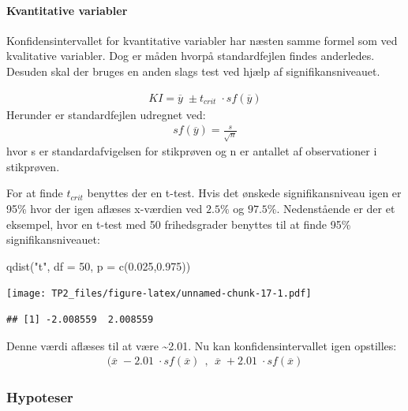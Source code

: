 \documentclass[
]{article}
\newenvironment{Shaded}{\begin{snugshade}}{\end{snugshade}}
\newcommand{\AttributeTok}[1]{\textcolor[rgb]{0.77,0.63,0.00}{#1}}
\newcommand{\DecValTok}[1]{\textcolor[rgb]{0.00,0.00,0.81}{#1}}
\newcommand{\FloatTok}[1]{\textcolor[rgb]{0.00,0.00,0.81}{#1}}
\newcommand{\FunctionTok}[1]{\textcolor[rgb]{0.00,0.00,0.00}{#1}}
\newcommand{\NormalTok}[1]{#1}
\newcommand{\StringTok}[1]{\textcolor[rgb]{0.31,0.60,0.02}{#1}}
\begin{document}
\hypertarget{kvantitative-variabler}{%
\paragraph{Kvantitative variabler}\label{kvantitative-variabler}}

Konfidensintervallet for kvantitative variabler har næsten samme formel
som ved kvalitative variabler. Dog er måden hvorpå standardfejlen findes
anderledes. Desuden skal der bruges en anden slags test ved hjælp af
signifikansniveauet.

\[
\begin{aligned}
KI = \overline{y}\;\pm t_{crit} \;\cdot sf(\overline{y})
\end{aligned}
\] Herunder er standardfejlen udregnet ved: \[
\begin{aligned}
sf(\overline{y}) = \frac{s}{\sqrt{n}}
\end{aligned}
\] hvor s er standardafvigelsen for stikprøven og n er antallet af
observationer i stikprøven.

For at finde \(t_{crit}\) benyttes der en t-test. Hvis det ønskede
signifikansniveau igen er 95\% hvor der igen aflæses x-værdien ved
\(2.5\%\) og \(97.5\%\). Nedenstående er der et eksempel, hvor en t-test
med 50 frihedsgrader benyttes til at finde 95\% signifikansniveauet:

\begin{Shaded}
\begin{Highlighting}[]
\FunctionTok{qdist}\NormalTok{(}\StringTok{"t"}\NormalTok{, }\AttributeTok{df =} \DecValTok{50}\NormalTok{, }\AttributeTok{p =} \FunctionTok{c}\NormalTok{(}\FloatTok{0.025}\NormalTok{,}\FloatTok{0.975}\NormalTok{))}
\end{Highlighting}
\end{Shaded}

\texttt{[image: TP2\_files/figure-latex/unnamed-chunk-17-1.pdf]}

\begin{verbatim}
## [1] -2.008559  2.008559
\end{verbatim}

Denne værdi aflæses til at være \textasciitilde2.01. Nu kan
konfidensintervallet igen opstilles: \[
\begin{aligned}
(\overline{x}\;-2.01 \;\cdot sf(\overline{x}) \ \ , \ \ \overline{x}\;+2.01 \;\cdot sf(\overline{x})
\end{aligned}
\]

\hypertarget{hypoteser}{%
\subsubsection{Hypoteser}\label{hypoteser}}
\end{document}
